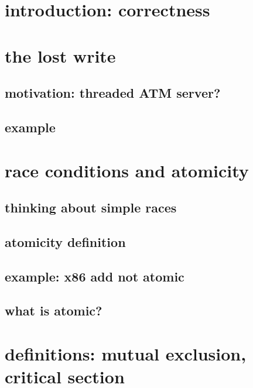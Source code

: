 \section{introduction: correctness}




\section{the lost write}

\subsection{motivation: threaded ATM server?}


\subsection{example}


\section{race conditions and atomicity}
\subsection{thinking about simple races} 


\subsection{atomicity definition}


\subsection{example: x86 add not atomic}


\subsection{what is atomic?}


\section{definitions: mutual exclusion, critical section}


